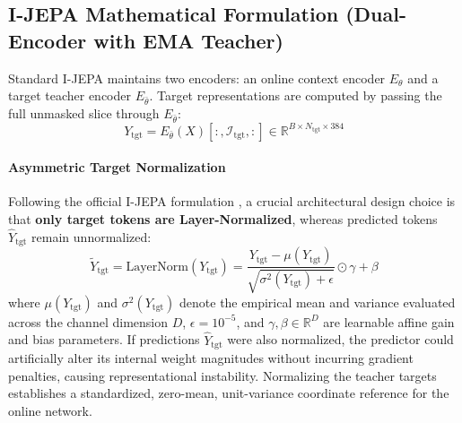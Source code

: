 \documentclass{article}
\begin{document}
\subsection{I-JEPA Mathematical Formulation (Dual-Encoder with EMA Teacher)}

Standard I-JEPA \citep{assran2023ijepa} maintains two encoders: an online context encoder $E_\theta$ and a target teacher encoder $E_{\bar{\theta}}$. Target representations are computed by passing the full unmasked slice through $E_{\bar{\theta}}$:
\begin{equation}
    Y_{\text{tgt}} = E_{\bar{\theta}}(X)[:, \mathcal{I}_{\text{tgt}}, :] \in \mathbb{R}^{B \times N_{\text{tgt}} \times 384}
\end{equation}

\paragraph{Asymmetric Target Normalization}
Following the official I-JEPA formulation \citep{assran2023ijepa}, a crucial architectural design choice is that \textbf{only target tokens are Layer-Normalized}, whereas predicted tokens $\hat{Y}_{\text{tgt}}$ remain unnormalized:
\begin{equation}
    \tilde{Y}_{\text{tgt}} = \text{LayerNorm}(Y_{\text{tgt}}) = \frac{Y_{\text{tgt}} - \mu(Y_{\text{tgt}})}{\sqrt{\sigma^2(Y_{\text{tgt}}) + \epsilon}} \odot \gamma + \beta
\end{equation}
where $\mu(Y_{\text{tgt}})$ and $\sigma^2(Y_{\text{tgt}})$ denote the empirical mean and variance evaluated across the channel dimension $D$, $\epsilon = 10^{-5}$, and $\gamma, \beta \in \mathbb{R}^D$ are learnable affine gain and bias parameters. If predictions $\hat{Y}_{\text{tgt}}$ were also normalized, the predictor could artificially alter its internal weight magnitudes without incurring gradient penalties, causing representational instability. Normalizing the teacher targets establishes a standardized, zero-mean, unit-variance coordinate reference for the online network.
\end{document}
